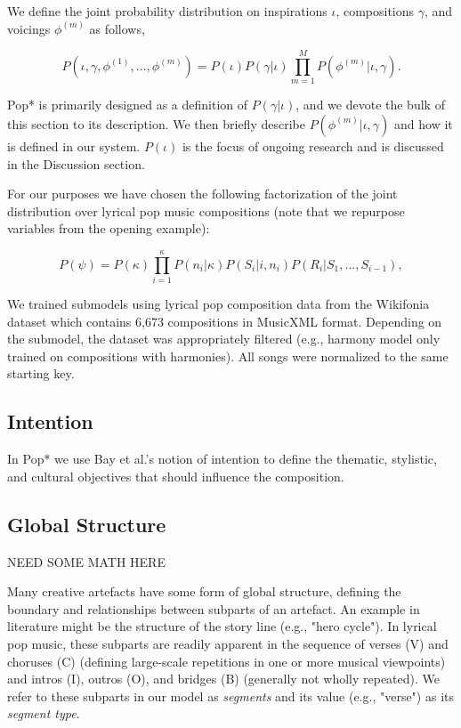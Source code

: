 \documentclass[letterpaper]{article}
\begin{document}
We define the joint probability distribution on inspirations $\iota$, compositions $\gamma$, and voicings $\phi^{(m)}$ as follows,

\[ P(\iota,\gamma,\phi^{(1)}, ..., \phi^{(m)}) = P(\iota)P(\gamma|\iota) \prod_{m=1}^{M} P(\phi^{(m)}|\iota,\gamma). \]

Pop* is primarily designed as a definition of $P(\gamma|\iota)$, and we devote the bulk of this section to its description. We then briefly describe $P(\phi^{(m)}|\iota,\gamma)$ and how it is defined in our system. $P(\iota)$ is the focus of ongoing research and is discussed in the Discussion section.

For our purposes we have chosen the following factorization of the joint distribution over lyrical pop music compositions (note that we repurpose variables from the opening example):

\[ P(\psi) = P(\kappa) \prod_{i=1}^{\kappa} P(n_i|\kappa)P(S_i|i,n_i)P(R_i|S_1, ..., S_{i-1}), \]

We trained submodels using lyrical pop composition data from the Wikifonia dataset which contains 6,673 compositions in MusicXML format. Depending on the submodel, the dataset was appropriately filtered (e.g., harmony model only trained on compositions with harmonies). All songs were normalized to the same starting key.

\subsection{Intention}

In Pop* we use Bay et al.'s notion of intention to define the thematic, stylistic, and cultural objectives that should influence the composition.

\subsection{Global Structure}

NEED SOME MATH HERE

Many creative artefacts have some form of global structure, defining the boundary and relationships between subparts of an artefact. An example in literature might be the structure of the story line (e.g., "hero cycle"). In lyrical pop music, these subparts are readily apparent in the sequence of verses (V) and choruses (C) (defining large-scale repetitions in one or more musical viewpoints) and intros (I), outros (O), and bridges (B) (generally not wholly repeated). We refer to these subparts in our model as \textit{segments} and its value (e.g., "verse") as its \textit{segment type}.
\end{document}
